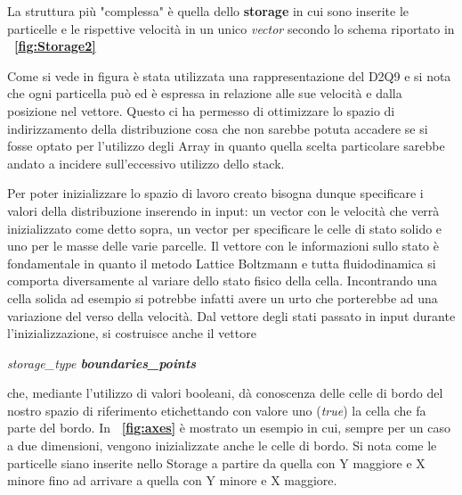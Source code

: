 {La struttura pi\`u "complessa" \`e quella dello \textbf{storage} in cui sono inserite le particelle e le rispettive velocit\`a in un unico \textit{vector} secondo lo schema riportato in \textbf{\figurename~\ref{fig:Storage2}}

Come si vede in figura \`e stata utilizzata una rappresentazione del D2Q9 e si nota che  ogni particella pu\`o ed \`e espressa in relazione alle sue velocit\`a e dalla posizione nel vettore. Questo ci ha permesso di ottimizzare lo spazio di indirizzamento della distribuzione cosa che non sarebbe potuta accadere se si fosse optato per l'utilizzo degli Array in quanto quella scelta particolare sarebbe andato a incidere sull'eccessivo utilizzo dello stack.

Per poter inizializzare lo spazio di lavoro creato bisogna dunque specificare i valori della distribuzione inserendo in input: un vector con le velocit\`a che verr\`a inizializzato come detto sopra, un vector per specificare le celle di stato solido e uno per le masse delle varie parcelle. Il vettore con le informazioni sullo stato \`e fondamentale in quanto il metodo Lattice Boltzmann e tutta fluidodinamica si comporta diversamente al variare dello stato fisico della cella. Incontrando una cella solida ad esempio si potrebbe infatti avere un urto che porterebbe ad una variazione del verso della velocit\`a. Dal vettore degli stati passato in input durante l'inizializzazione, si costruisce anche il vettore 
\begin{center}
	\textit{storage\_type \textbf{boundaries\_points}}\\
\end{center}
che, mediante l'utilizzo di valori booleani, d\`a conoscenza delle celle di bordo del nostro spazio di riferimento etichettando con valore uno (\textit{true}) la cella che fa parte del bordo. 
In \textbf{\figurename~\ref{fig:axes}} \`e mostrato un esempio in cui, sempre per un caso a due dimensioni, vengono inizializzate anche le celle di bordo. Si nota come le particelle siano inserite nello Storage a partire da quella con Y maggiore e X minore fino ad arrivare a quella con Y minore e X maggiore.


}
